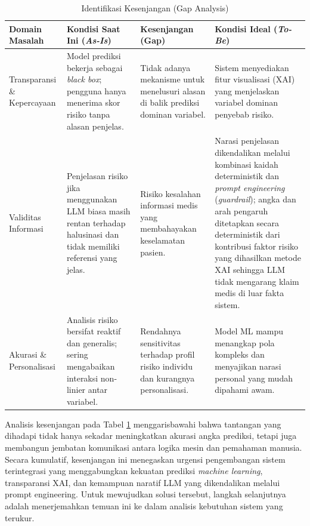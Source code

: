 \begin{table}[H]
    \caption{Identifikasi Kesenjangan (Gap Analysis)}
    \label{tab:gap-analysis}
    \centering
    \small
    \begin{tabular}{|p{2.5cm}|p{3.5cm}|p{3.5cm}|p{3.5cm}|}
        \hline
        \textbf{Domain Masalah} & \textbf{Kondisi Saat Ini (\emph{As-Is})} & \textbf{Kesenjangan (Gap)} & \textbf{Kondisi Ideal (\emph{To-Be})} \\
        \hline
        Transparansi \& Kepercayaan & Model prediksi bekerja sebagai \textit{black box}; pengguna hanya menerima skor risiko tanpa alasan penjelas. & Tidak adanya mekanisme untuk menelusuri alasan di balik prediksi dominan variabel. & Sistem menyediakan fitur visualisasi (XAI) yang menjelaskan variabel dominan penyebab risiko. \\
        \hline
        Validitas Informasi & Penjelasan risiko jika menggunakan LLM biasa masih rentan terhadap halusinasi dan tidak memiliki referensi yang jelas. & Risiko kesalahan informasi medis yang membahayakan keselamatan pasien. & Narasi penjelasan dikendalikan melalui kombinasi kaidah deterministik dan \textit{prompt engineering} (\emph{guardrail}); angka dan arah pengaruh ditetapkan secara deterministik dari kontribusi faktor risiko yang dihasilkan metode XAI sehingga LLM tidak mengarang klaim medis di luar fakta sistem. \\
        \hline
        Akurasi \& Personalisasi & Analisis risiko bersifat reaktif dan generalis; sering mengabaikan interaksi non-linier antar variabel. & Rendahnya sensitivitas terhadap profil risiko individu dan kurangnya personalisasi. & Model ML mampu menangkap pola kompleks dan menyajikan narasi personal yang mudah dipahami awam. \\
        \hline
    \end{tabular}
\end{table}

Analisis kesenjangan pada Tabel \ref{tab:gap-analysis} menggarisbawahi bahwa tantangan yang dihadapi tidak hanya sekadar meningkatkan akurasi angka prediksi, tetapi juga membangun jembatan komunikasi antara logika mesin dan pemahaman manusia. Secara kumulatif, kesenjangan ini menegaskan urgensi pengembangan sistem terintegrasi yang menggabungkan kekuatan prediksi \textit{machine learning}, transparansi XAI, dan kemampuan naratif LLM yang dikendalikan melalui prompt engineering. Untuk mewujudkan solusi tersebut, langkah selanjutnya adalah menerjemahkan temuan ini ke dalam analisis kebutuhan sistem yang terukur.

